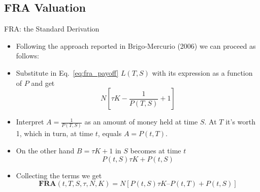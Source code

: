 \documentclass{beamer}
\begin{document}
%	
%	

\subsection{FRA Valuation}
\begin{frame}{FRA: the Standard Derivation}
	\begin{itemize}
		\item Following the approach reported in Brigo-Mercurio (2006) we can proceed as follows:
		\item Substitute in Eq.~\ref{eq:fra_payoff} $L(T,S)$ with its expression as a function of $P$ and get
		\begin{equation*}
			N[\tau K - \frac{1}{P(T, S)} + 1]
		\end{equation*}
		\item Interpret $A=\frac{1}{P(T,S)}$ as an amount of money held at time $S$. At $T$ it's worth 1, which in turn, at time $t$, equals $A=P(t,T)$.
		\item On the other hand $B=\tau K + 1$ in $S$ becomes at time $t$
		\begin{equation*}
			P(t,S)\tau K + P(t, S)
		\end{equation*}
		\item Collecting the terms we get
		\begin{equation}
			\mathbf{FRA}(t,T,S,\tau,N,K)=N[P(t,S)\tau K–P(t,T)+P(t,S)]
		\end{equation}
	\end{itemize}
\end{frame}
\end{document}
